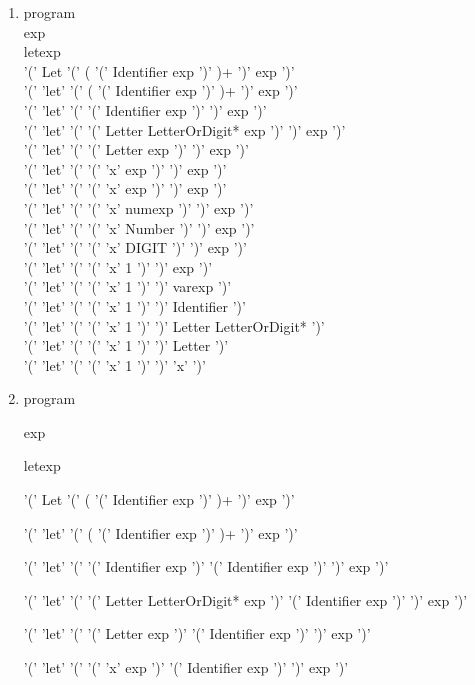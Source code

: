 \documentclass[11pt]{article}
\begin{document}
\begin{enumerate}
	\item
		program \\
		exp \\
		letexp \\
		'(' Let '(' ( '(' Identifier exp ')' )+ ')' exp ')' \\
		'(' 'let' '(' ( '(' Identifier exp ')' )+ ')' exp ')' \\
		'(' 'let' '(' '(' Identifier exp ')' ')' exp ')' \\
		'(' 'let' '(' '(' Letter LetterOrDigit* exp ')' ')' exp ')' \\
		'(' 'let' '(' '(' Letter exp ')' ')' exp ')' \\
		'(' 'let' '(' '(' 'x' exp ')' ')' exp ')' \\
		'(' 'let' '(' '(' 'x' exp ')' ')' exp ')' \\
		'(' 'let' '(' '(' 'x' numexp ')' ')' exp ')' \\
		'(' 'let' '(' '(' 'x' Number ')' ')' exp ')' \\
		'(' 'let' '(' '(' 'x' DIGIT ')' ')' exp ')' \\
		'(' 'let' '(' '(' 'x' 1 ')' ')' exp ')' \\
		'(' 'let' '(' '(' 'x' 1 ')' ')' varexp ')' \\
		'(' 'let' '(' '(' 'x' 1 ')' ')' Identifier ')' \\
		'(' 'let' '(' '(' 'x' 1 ')' ')' Letter LetterOrDigit* ')' \\
		'(' 'let' '(' '(' 'x' 1 ')' ')' Letter ')' \\
		'(' 'let' '(' '(' 'x' 1 ')' ')' 'x' ')' \\

	\item
		program

		exp

		letexp

		'(' Let '(' ( '(' Identifier exp ')' )+ ')' exp ')'

		'(' 'let' '(' ( '(' Identifier exp ')' )+ ')' exp ')'

		'(' 'let' '(' '(' Identifier exp ')' '(' Identifier exp ')' ')' exp ')'

		'(' 'let' '(' '(' Letter LetterOrDigit* exp ')' '(' Identifier exp ')' ')' exp ')'

		'(' 'let' '(' '(' Letter exp ')' '(' Identifier exp ')' ')' exp ')'

		'(' 'let' '(' '(' 'x' exp ')' '(' Identifier exp ')' ')' exp ')'


\end{enumerate}
\end{document}

